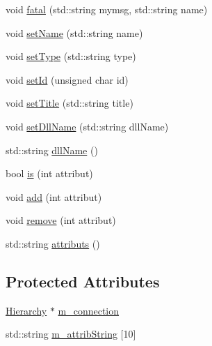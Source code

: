 \begin{DoxyCompactItemize}
void \hyperlink{classObject_ae62acd3d09f716220f75f252dc38bc9a}{fatal} (std::string mymsg, std::string name)
\item 
void \hyperlink{classObject_ae30fea75683c2d149b6b6d17c09ecd0c}{setName} (std::string name)
\item 
void \hyperlink{classObject_aae534cc9d982bcb9b99fd505f2e103a5}{setType} (std::string type)
\item 
void \hyperlink{classObject_a398fe08cba594a0ce6891d59fe4f159f}{setId} (unsigned char id)
\item 
void \hyperlink{classObject_a89557dbbad5bcaa02652f5d7fa35d20f}{setTitle} (std::string title)
\item 
void \hyperlink{classObject_a870c5af919958c2136623b2d7816d123}{setDllName} (std::string dllName)
\item 
std::string \hyperlink{classObject_a2e3947f2870094c332d7454117f3ec63}{dllName} ()
\item 
bool \hyperlink{classAttrib_a704f26af560909ad22065083bb7d4c34}{is} (int attribut)
\item 
void \hyperlink{classAttrib_a235f773af19c900264a190b00a3b4ad7}{add} (int attribut)
\item 
void \hyperlink{classAttrib_a7d4ef7e32d93cb287792b87b857e79f3}{remove} (int attribut)
\item 
std::string \hyperlink{classAttrib_aee7bbf16b144887f196e1341b24f8a26}{attributs} ()
\end{DoxyCompactItemize}
\subsection*{Protected Attributes}
\begin{DoxyCompactItemize}
\item 
\hyperlink{classHierarchy}{Hierarchy} $\ast$ \hyperlink{classElement_abe3de7a5dbbc9a6dd2d7e012e5fdb266}{m\_\-connection}
\item 
std::string \hyperlink{classAttrib_a3414521d7a82476e874b25a5407b5e63}{m\_\-attribString} \mbox{[}10\mbox{]}
\end{DoxyCompactItemize}
